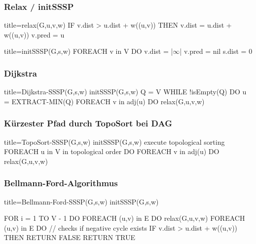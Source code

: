         \subsubsection{Relax / initSSSP}
            \begin{ccode}[autogobble, escapeinside=||]{title={relax(G,u,v,w)}}
            IF v.dist > u.dist + w((u,v)) THEN
                v.dist = u.dist + w((u,v))
                v.pred = u
            \end{ccode}

            \begin{ccode}[autogobble, escapeinside=||]{title={initSSSP(G,s,w)}}
            FOREACH v in V DO
                v.dist = |$\infty$|
                v.pred = nil
            s.dist = 0
            \end{ccode}

        \subsubsection{Dijkstra}
            \begin{ccode}[autogobble, escapeinside=||]{title={Dijkstra-SSSP(G,s,w)}}
            initSSSP(G,s,w)
            Q = V
            WHILE !isEmpty(Q) DO
                u = EXTRACT-MIN(Q)
                FOREACH v in adj(u) DO
                    relax(G,u,v,w)
            \end{ccode}
        
        \subsubsection{Kürzester Pfad durch TopoSort bei DAG}
            \begin{ccode}[autogobble, escapeinside=||]{title={TopoSort-SSSP(G,s,w)}}
            initSSSP(G,s,w)
            execute topological sorting
            FOREACH u in V in topological order DO
                FOREACH v in adj(u) DO
                    relax(G,u,v,w)
            \end{ccode}

        \subsubsection{Bellmann-Ford-Algorithmus}
            \begin{ccode}[autogobble, escapeinside=||]{title={Bellmann-Ford-SSSP(G,s,w)}}
            initSSSP(G,s,w)

            FOR i = 1 TO V - 1 DO
                FOREACH (u,v) in E DO
                    relax(G,u,v,w)
            FOREACH (u,v) in E DO   // checks if negative cycle exists
                IF v.dist > u.dist + w((u,v)) THEN
                    RETURN FALSE
            RETURN TRUE
            \end{ccode}
            
